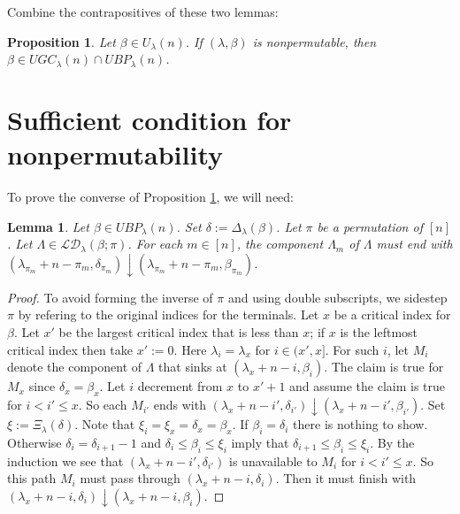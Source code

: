\documentclass[11pt]{article}
\newtheorem{lem}[thm]{Lemma}
\newtheorem{prop}[thm]{Proposition}
\theoremstyle{definition}
\theoremstyle{remark}
\numberwithin{equation}{section}
\begin{document}
\begin{spacing}{1.35}
Combine the contrapositives of these two lemmas:

\begin{prop}\label{prop434.7}Let $\beta \in U_\lambda(n)$.  If $(\lambda, \beta)$ is nonpermutable, then $\beta \in UGC_\lambda(n) \cap UBP_\lambda(n)$.  \end{prop}









\section{Sufficient condition for nonpermutability}


To prove the converse of Proposition \ref{prop434.7}, we will need:

\begin{lem}\label{lemma581.5}Let $\beta \in UBP_\lambda(n)$.  Set $\delta := \Delta_\lambda(\beta)$.  Let $\pi$ be a permutation of $[n]$.  Let $\Lambda \in \mathcal{LD}_\lambda(\beta;\pi)$.  For each $m \in [n]$, the component $\Lambda_m$ of $\Lambda$ must end with $(\lambda_{\pi_m}+n-\pi_m, \delta_{\pi_m}) \downarrow (\lambda_{\pi_m}+n-\pi_m, \beta_{\pi_m})$.  \end{lem}

\begin{proof}To avoid forming the inverse of $\pi$ and using double subscripts, we sidestep $\pi$ by refering to the original indices for the terminals.  Let $x$ be a critical index for $\beta$.  Let $x'$ be the largest critical index that is less than $x$;  if $x$ is the leftmost critical index then take $x' := 0$.  Here $\lambda_i = \lambda_x$ for $i \in (x', x]$.  For such $i$, let $M_i$ denote the component of $\Lambda$ that sinks at $(\lambda_x + n - i, \beta_i)$.  The claim is true for $M_x$ since $\delta_x = \beta_x$.  Let $i$ decrement from $x$ to $x' + 1$ and assume the claim is true for $i < i' \leq x$.  So each $M_{i'}$ ends with $(\lambda_x + n - i', \delta_{i'}) \downarrow (\lambda_x + n - i', \beta_{i'})$.  Set $\xi := \Xi_\lambda(\delta)$.  Note that $\xi_i = \xi_x = \delta_x = \beta_x$.  If $\beta_i = \delta_i$ there is nothing to show.  Otherwise $\delta_i = \delta_{i+1}-1$ and $\delta_i \leq \beta_i \leq \xi_i$ imply that $\delta_{i+1} \leq \beta_i \leq \xi_i$.  By the induction we see that $(\lambda_x + n - i', \delta_{i'})$ is unavailable to $M_{i}$ for $i < i' \leq x$.  So this path $M_i$ must pass through $(\lambda_x + n - i, \delta_i)$.  Then it must finish with $(\lambda_x + n - i, \delta_i) \downarrow (\lambda_x + n - i, \beta_i)$.  \end{proof}




\end{spacing}
\end{document}
